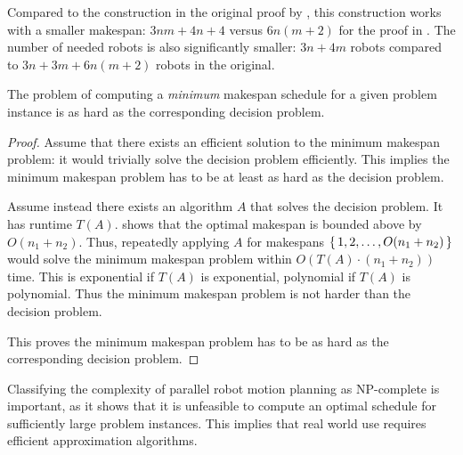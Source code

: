 Compared to the construction in the original proof by \cite{siamcomp/DemaineFKMS19}, this construction works with a smaller makespan: \(3nm + 4n + 4\) versus \(6n(m + 2)\) for the proof in \cite{siamcomp/DemaineFKMS19}. 
The number of needed robots is also significantly smaller: \(3n + 4m\) robots compared to \(3n + 3m + 6n(m + 2)\) robots in the original. 

\begin{corollary}
	The problem of computing a \emph{minimum} makespan schedule for a given problem instance is as hard as the corresponding decision problem. 
\end{corollary}

\begin{proof}
	Assume that there exists an efficient solution to the minimum makespan problem: it would trivially solve the decision problem efficiently. This implies the minimum makespan problem has to be at least as hard as the decision problem. 

	
	Assume instead there exists an algorithm \(A\) that solves the decision problem. 
	It has runtime \(T(A)\). 
	\cite{siamcomp/DemaineFKMS19} shows that the optimal makespan is bounded above by \(O(n_1 + n_2)\). 
	Thus, repeatedly applying \(A\) for makespans \(\set{1, 2, \dots, O(n_1 + n_2)}\) would solve the minimum makespan problem within \(O(T(A) \cdot (n_1 + n_2) )\) time. 
	This is exponential if \(T(A)\) is exponential, polynomial if \(T(A)\) is polynomial. 
	Thus the minimum makespan problem is not harder than the decision problem. 

	This proves the minimum makespan problem has to be as hard as the corresponding decision problem.
\end{proof} 

Classifying the complexity of parallel robot motion planning as NP-complete is important, as it shows that it is unfeasible to compute an optimal schedule for sufficiently large problem instances. 
This implies that real world use requires efficient approximation algorithms.



